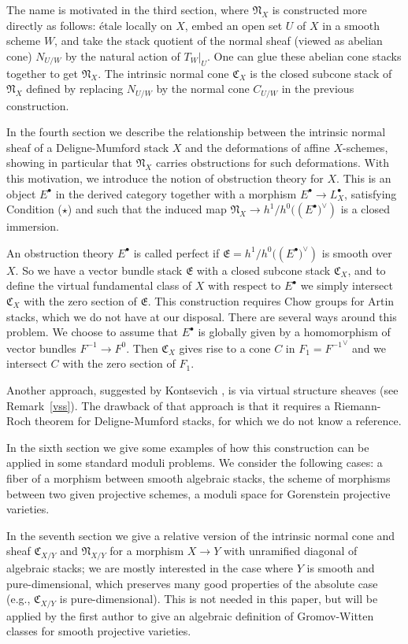 \documentclass[11pt]{article}
\theoremstyle{plain}
\theoremstyle{definition}
\newcommand{\dual}[1]{{{#1}^{\vee}}}
\newcommand{\com}{^{\scriptscriptstyle\bullet}}
\newcommand{\EE}{{\mathfrak{E}}}
\newcommand{\NN}{{\mathfrak{N}}}
\newcommand{\CC}{{\mathfrak{C}}}
\theoremstyle{plain}
\theoremstyle{definition}
\theoremstyle{remark}
\begin{document}
The name is motivated in the third section, where \(\NN_X\)
is constructed more directly as follows: \'etale locally on \(X\), embed
an open set \(U\) of \(X\) in a smooth scheme \(W\), and take the stack
quotient of the normal sheaf (viewed as abelian cone) \(N_{U/W}\) by the
natural action of \(T_W|_U\). One can glue these abelian cone stacks
together to get \(\NN_X\).  The intrinsic normal cone \(\CC_X\) is the closed
subcone stack of \(\NN_X\) defined by replacing
\(N_{U/W}\) by the normal cone \(C_{U/W}\) in the previous construction.

In the fourth section we describe the relationship between the intrinsic normal
sheaf of a Deligne-Mumford stack \(X\) and the deformations of affine
\(X\)-schemes, showing in particular that \(\NN_X\) carries obstructions for such
deformations. With this motivation, we introduce the notion of
obstruction theory for \(X\). This is an object \(E\com\) in the
derived category together with a morphism \(E\com\to L_X\com\),
satisfying Condition (\(\star\)) and such that the induced
map \(\NN_X\to h^1/h^0((E\com\dual))\) is a closed immersion.

An obstruction theory \(E\com\) is called perfect if
\(\EE=h^1/h^0((E\com\dual))\) is smooth over \(X\). So we have a vector
bundle stack \(\EE\) with a closed subcone stack \(\CC_X\), and to define
the virtual fundamental class of \(X\) with respect to \(E\com\) we simply
intersect \(\CC_X\) with the zero section of \(\EE\). This construction
requires Chow groups for Artin stacks, which we do not have at our
disposal. There are several ways around  this problem. We choose to
assume that \(E\com\) is globally given by a homomorphism of vector
bundles \(F^{-1}\to F^0\). Then \(\CC_X\) gives rise to a cone \(C\) in
\(F_1=\dual{F^{-1}}\) and we intersect \(C\) with the zero section of
\(F_1\).

Another approach, suggested by Kontsevich \cite{K}, is via virtual
structure sheaves (see Remark~\ref{vss}). The drawback of that
approach is that it requires a Riemann-Roch theorem for
Deligne-Mumford stacks, for which we do not know a reference.

In the sixth section we give some examples of how this construction
can be applied in some standard moduli problems. We consider the
following cases: a fiber of a morphism between smooth algebraic
stacks, the scheme of morphisms between two given projective schemes,
a moduli space for Gorenstein projective varieties.

In the seventh section we give a relative version of the intrinsic
normal cone and sheaf \(\CC_{X/Y}\) and \(\NN_{X/Y}\) for a morphism \(X\to
Y\) with unramified diagonal of algebraic stacks; we are mostly
interested in the case where \(Y\) is smooth and pure-dimensional, which
preserves many good properties of the absolute case (e.g., \(\CC_{X/Y}\)
is pure-dimensional). This is not needed in this paper, but will be
applied by the first author to give an algebraic definition of
Gromov-Witten classes for smooth projective varieties.
\end{document}
